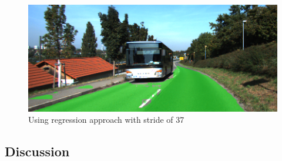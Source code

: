 \begin{figure}[hbp]
	\centering
	\includegraphics[width=\columnwidth]{figures/models/testing2-um_32_conv_stride37.png}
	\caption{Using regression approach with stride of 37}
	\label{fig:reg_stride10}
\end{figure} 

\subsection{Discussion}